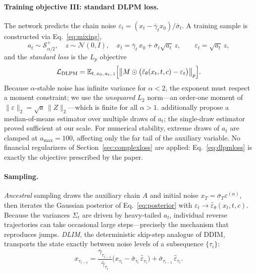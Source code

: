 \documentclass[12pt,letterpaper]{article}
\begin{document}
\paragraph{Training objective III: standard DLPM loss.}
The network predicts the chain noise
$\varepsilon_t = (x_t - \bar\gamma_t x_0)/\bar\sigma_t$. A training sample is
constructed via Eq.~\eqref{eq:mixing},
\begin{equation}
a_t \sim \mathcal{S}_{\alpha/2}^{+}, \quad z \sim \mathcal{N}(0, I), \quad
x_t = \bar\gamma_t\, x_0 + \bar\sigma_t \sqrt{a_t}\, z,
\qquad \varepsilon_t = \sqrt{a_t}\, z,
\end{equation}
and the \emph{standard loss} is the $L_p$ objective
\begin{equation}
\mathcal{L}_{\mathrm{DLPM}}
= \mathbb{E}_{t,\,x_0,\,a_t,\,z}
\Bigl[\bigl\| M \odot \bigl(\hat\varepsilon_\theta(x_t, t, c) -
\varepsilon_t\bigr)\bigr\|_p \Bigr].
\label{eq:dlpmloss}
\end{equation}
Because $\alpha$-stable noise has infinite variance for $\alpha < 2$, the
exponent must respect a moment constraint; we use the \emph{unsquared} $L_2$
norm---an order-one moment of
$\|\varepsilon\|_2 = \sqrt{a}\,\|Z\|_2$---which is finite for all
$\alpha > 1$. \citet{shariatian2024dlpm} additionally propose a
median-of-means estimator over multiple draws of $a_t$; the single-draw
estimator proved sufficient at our scale. For numerical stability, extreme
draws of $a_t$ are clamped at $a_{\max} = 100$, affecting only the far tail
of the auxiliary variable. No financial regularizers of
Section~\ref{sec:complexloss} are applied: Eq.~\eqref{eq:dlpmloss} is exactly
the objective prescribed by the paper.

\paragraph{Sampling.}
\emph{Ancestral} sampling draws the auxiliary chain $A$ and initial noise
$x_T = \bar\sigma_T \varepsilon^{(\alpha)}$, then iterates the Gaussian
posterior of Eq.~\eqref{eq:posterior} with
$\varepsilon_t \to \hat\varepsilon_\theta(x_t, t, c)$. Because the variances
$\Sigma_t$ are driven by heavy-tailed $a_t$, individual reverse trajectories
can take occasional large steps---precisely the mechanism that reproduces
jumps. \emph{DLIM}, the deterministic skip-step analogue of DDIM, transports
the state exactly between noise levels of a subsequence $\{\tau_i\}$:
\begin{equation}
x_{\tau_{i-1}}
= \frac{\bar\gamma_{\tau_{i-1}}}{\bar\gamma_{\tau_i}}
\bigl(x_{\tau_i} - \bar\sigma_{\tau_i}\,\hat\varepsilon_{\tau_i}\bigr)
+ \bar\sigma_{\tau_{i-1}}\, \hat\varepsilon_{\tau_i}.
\label{eq:dlim}
\end{equation}
\end{document}
